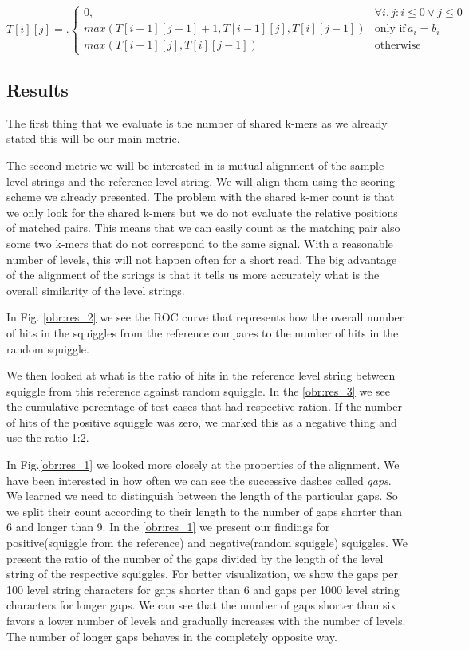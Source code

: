 \[
T[i][j] = \bigl.
  \begin{cases}
    0, & \forall i,j : i\leq 0 \lor j\leq 0 \\
    max(T[i-1][j-1] + 1, T[i-1][j], T[i][j-1]) & \text{only if} \, a_i = b_i \\ 
    max(T[i-1][j], T[i][j-1]) & \text{otherwise}
  \end{cases}
\]

\subsection{Results}

The first thing that we evaluate is the number of shared k-mers as we already
stated this will be our main metric.

The second metric we will be interested in is mutual alignment of the sample
level strings and the reference level string. We will align them using the scoring
scheme we already presented. The problem with the shared k-mer count is that we only look
for the shared k-mers but we do not evaluate the relative positions of matched pairs.
This means that we can easily count as the matching pair also some two k-mers that
do not correspond to the same signal. With a reasonable number of levels, this will
not happen often for a short read. The big advantage of the alignment of the strings
is that it tells us more accurately what is the overall similarity of the level strings.

In Fig. \ref{obr:res_2} we see the ROC curve that represents how the overall number
of hits in the squiggles from the reference compares to the number of hits in the
random squiggle.

We then looked at what is the ratio of hits in the reference level string between squiggle
from this reference against random squiggle. In the \ref{obr:res_3} we see the cumulative percentage
of test cases that had respective ration. If the number of hits of the positive squiggle
was zero, we marked this as a negative thing and use the ratio 1:2.

In Fig.\ref{obr:res_1} we looked more closely at the properties of the alignment. We
have been interested in how often we can see the successive dashes called \textit{gaps}.
We learned we need to distinguish between the length of the particular gaps. So we split
their count according to their length to the number of gaps shorter than 6 and longer than 9.
In the \ref{obr:res_1} we present our findings for positive(squiggle from the reference)
and negative(random squiggle) squiggles. We present the ratio of the number of the gaps divided
by the length of the level string of the respective squiggles. For better visualization,
we show the gaps per 100 level string characters for gaps shorter than 6 and gaps
per 1000 level string characters for longer gaps. We can see that the number of gaps
shorter than six favors a lower number of levels and gradually increases with the number
of levels. The number of longer gaps behaves in the completely opposite way. 

